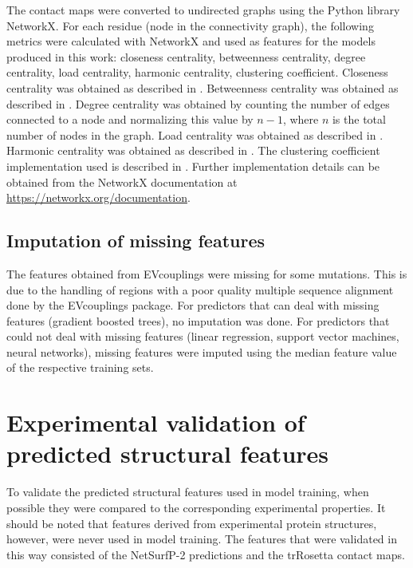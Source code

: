 The contact maps were converted to undirected graphs using the Python library NetworkX.
For each residue (node in the connectivity graph), the following metrics were calculated with NetworkX and used as features for the models produced in this work: closeness centrality, betweenness centrality, degree centrality, load centrality, harmonic centrality, clustering coefficient.
Closeness centrality was obtained as described in \textcite{Freeman1978}.
Betweenness centrality was obtained as described in \textcite{Brandes2001}.
Degree centrality was obtained by counting the number of edges connected to a node and normalizing this value by $n-1$, where $n$ is the total number of nodes in the graph.
Load centrality was obtained as described in \textcite{Newman2001}.
Harmonic centrality was obtained as described in \textcite{Boldi2014}.
The clustering coefficient implementation used is described in \textcite{Onnela2005}.
Further implementation details can be obtained from the NetworkX documentation at \url{https://networkx.org/documentation}.

\subsection{Imputation of missing features}\label{sec:mm_missing}
The features obtained from EVcouplings were missing for some mutations.
This is due to the handling of regions with a poor quality multiple sequence alignment done by the EVcouplings package.
For predictors that can deal with missing features (gradient boosted trees), no imputation was done.
For predictors that could not deal with missing features (linear regression, support vector machines, neural networks), missing features were imputed using the median feature value of the respective training sets.

\section{Experimental validation of predicted structural features}\label{sec:mm_exp_val}
To validate the predicted structural features used in model training, when possible they were compared to the corresponding experimental properties.
It should be noted that features derived from experimental protein structures, however, were never used in model training.
The features that were validated in this way consisted of the NetSurfP-2 predictions and the trRosetta contact maps.

